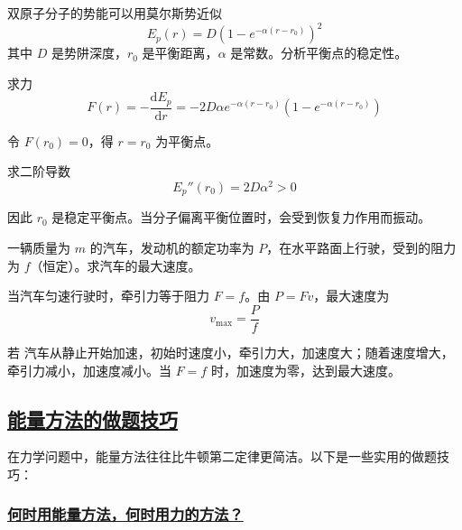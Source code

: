 \begin{example}
    双原子分子的势能可以用莫尔斯势近似
    \begin{equation}
        E_p(r) = D\left(1 - e^{-\alpha(r - r_0)}\right)^2
    \end{equation}
    其中 $D$ 是势阱深度，$r_0$ 是平衡距离，$\alpha$ 是常数。分析平衡点的稳定性。
    \begin{solution}
        求力
        \begin{equation}
            F(r) = -\frac{\mathrm{d}E_p}{\mathrm{d}r} = -2D\alpha e^{-\alpha(r-r_0)}\left(1 - e^{-\alpha(r-r_0)}\right)
        \end{equation}
        
        令 $F(r_0) = 0$，得 $r = r_0$ 为平衡点。
        
        求二阶导数
        \begin{equation}
            E_p''(r_0) = 2D\alpha^2 > 0
        \end{equation}
        
        因此 $r_0$ 是稳定平衡点。当分子偏离平衡位置时，会受到恢复力作用而振动。
    \end{solution}
\end{example}

\begin{example}[功率——汽车的最大速度]
    一辆质量为 $m$ 的汽车，发动机的额定功率为 $P$，在水平路面上行驶，受到的阻力为 $f$（恒定）。求汽车的最大速度。
    \begin{solution}
        当汽车匀速行驶时，牵引力等于阻力 $F = f$。由 $P = Fv$，最大速度为
        \begin{equation}
            v_{\max} = \frac{P}{f}
        \end{equation}
        
        若        汽车从静止开始加速，初始时速度小，牵引力大，加速度大；随着速度增大，牵引力减小，加速度减小。当 $F = f$ 时，加速度为零，达到最大速度。
    \end{solution}
\end{example}

\subsection{\protect\hyperlink{:}{能量方法的做题技巧}}

在力学问题中，能量方法往往比牛顿第二定律更简洁。以下是一些实用的做题技巧：

\subsubsection{\protect\hyperlink{:}{何时用能量方法，何时用力的方法？}}

